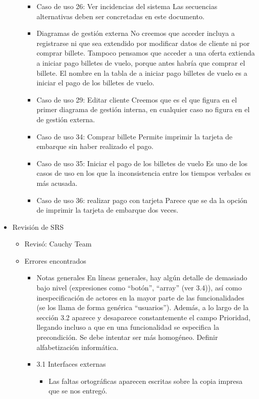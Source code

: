 \documentclass[11pt, a4paper, twoside, titlepage]{article}
\begin{document}
\begin{itemize}
\begin{itemize}
\begin{itemize}
							\item Caso de uso 26: Ver incidencias del sistema 
								Las secuencias alternativas deben ser concretadas en este documento.
							\item Diagramas de gestión externa 
								No creemos que acceder incluya a registrarse ni que sea extendido por modificar datos de cliente ni por comprar billete. Tampoco pensamos que acceder a una oferta extienda a iniciar pago billetes de vuelo, porque antes habría que comprar el billete. El nombre en la tabla de a iniciar pago billetes de vuelo es a iniciar el pago de los billetes de vuelo.
							\item Caso de uso 29: Editar cliente 
								Creemos que es el que figura en el primer diagrama de gestión interna, en cualquier caso no figura en el de gestión externa.
							\item Caso de uso 34: Comprar billete 
								Permite imprimir la tarjeta de embarque sin haber realizado el pago.
							\item Caso de uso 35: Iniciar el pago de los billetes de vuelo 
								Es uno de los casos de uso en los que la inconsistencia entre los tiempos verbales es más acusada.
							\item Caso de uso 36: realizar pago con tarjeta 
								Parece que se da la opción de imprimir la tarjeta de embarque dos veces.
						\end{itemize}
				\end{itemize}	
			\item Revisión de SRS
				\begin{itemize}
					\item Revisó: Cauchy Team
					\item Errores encontrados 
						\begin{itemize}
							\item Notas generales 
								En líneas generales, hay algún detalle de demasiado bajo nivel (expresiones como “botón”, “array” (ver 3.4)), así como inespecificación de actores en la mayor parte de las funcionalidades (se los llama de forma genérica “usuarios”). Además, a lo largo de la sección 3.2 aparece y desaparece constantemente el campo Prioridad, llegando incluso a que en una funcionalidad se especifica la precondición. Se debe intentar ser más homogéneo. Definir alfabetización informática.
							\item 3.1 Interfaces externas 
								\begin{itemize}
								\item Las faltas ortográficas aparecen escritas sobre la copia impresa que se nos entregó. 

\end{itemize}
\end{itemize}
\end{itemize}
\end{itemize}
\end{document}
